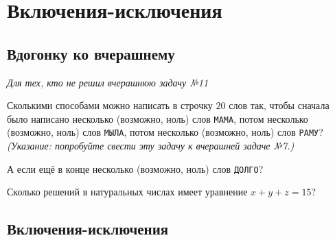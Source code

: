 

\section*{Включения-исключения}


\subsection*{Вдогонку ко вчерашнему}

\emph{Для тех, кто не решил вчерашнюю задачу №11}

\begin{problems}

\item
Сколькими способами можно написать в строчку $20$ слов так, чтобы сначала было
написано несколько (возможно, ноль) слов \texttt{МАМА}, потом несколько
(возможно, ноль) слов \texttt{МЫЛА}, потом несколько (возможно, ноль) слов
\texttt{РАМУ}?
\emph{(Указание: попробуйте свести эту задачу к вчерашней задаче №7.)}

\item
А если ещё в конце несколько (возможно, ноль) слов \texttt{ДОЛГО}?

\item
Сколько решений в натуральных числах имеет уравнение $x + y + z = 15$?

\end{problems}


\subsection*{Включения-исключения}

